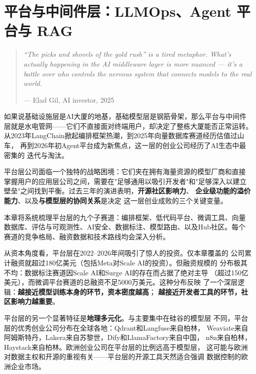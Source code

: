 
\chapter{平台与中间件层：LLMOps、Agent 平台与 RAG}
\label{ch:platform}

\begin{quote}
\itshape
``The picks and shovels of the gold rush'' is a tired metaphor.
What's actually happening in the AI middleware layer is more nuanced
--- it's a battle over who controls the nervous system that connects
models to the real world.

\hfill --- \textup{Elad Gil}, AI investor, 2025
\end{quote}

\bigskip

如果说基础设施层是AI大厦的地基，基础模型层是钢筋骨架，那么平台与中间件
层就是水电管网——它们不直接面对终端用户，却决定了整栋大厦能否正常运转。
从2023年LangChain掀起编排框架热潮，到2025年向量数据库赛道经历估值过山车，
再到2026年初Agent平台成为新焦点，这一层的创业公司经历了AI生态中最密集的
迭代与淘汰。

平台层公司面临一个独特的战略困境：它们夹在拥有海量资源的模型厂商和直接
掌握用户的应用层公司之间，需要在"足够通用以吸引开发者"和"足够深入以建立
壁垒"之间找到平衡。过去三年的演进表明，\textbf{开源社区影响力}、
\textbf{企业级功能的溢价能力}、以及\textbf{与模型层的协同关系}是决定
这一层创业成败的三个关键变量。

本章将系统梳理平台层的九个子赛道：编排框架、低代码平台、微调工具、向量
数据库、评估与可观测性、AI安全、数据标注、模型路由、以及Hub社区。每个
赛道的竞争格局、融资数据和技术路线均会深入分析。

从资本角度看，平台层在2022--2026年间吸引了惊人的投资。仅本章覆盖的
公司累计融资就超过180亿美元（包括Meta对Scale AI的投资）。但融资规模的
分布极其不均：数据标注赛道因Scale AI和Surge AI的存在而占据了绝对主导
（超过150亿美元），而微调平台赛道的总融资不足5000万美元。这种分布反映
了一个深层逻辑：\textbf{越接近模型训练本身的环节，资本密度越高}；
\textbf{越接近开发者工具的环节，社区影响力越重要}。

平台层的另一个显著特征是\textbf{地理多元化}。与主要集中在硅谷的模型层
不同，平台层的优秀创业公司分布在全球各地：Qdrant和Langfuse来自柏林，
Weaviate来自阿姆斯特丹，Lakera来自苏黎世，Dify和LlamaFactory来自中国，
n8n来自柏林，Haystack来自柏林。欧洲创业公司在平台层的比例远高于模型层，
这可能与欧洲对数据主权和开源的重视有关——平台层的开源工具天然适合强调
数据控制的欧洲企业市场。

